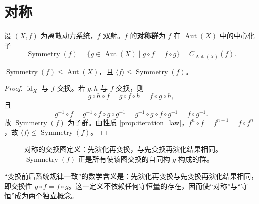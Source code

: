 \section{对称}

\begin{definition}[动力系统的对称群]\label{def:symmetry_group}
设 $(X,f)$ 为离散动力系统，$f$ 双射。$f$ 的\textbf{对称群}为 $f$ 在 $\operatorname{Aut}(X)$ 中的中心化子
\[
\operatorname{Symmetry}(f)=\{g\in\operatorname{Aut}(X)\mid g\circ f=f\circ g\}
=C_{\operatorname{Aut}(X)}(f).
\]
\end{definition}

\begin{property}[对称群是群]\label{prop:symmetry_group_is_group}
$\operatorname{Symmetry}(f)\le\operatorname{Aut}(X)$，且 $\langle f\rangle\le\operatorname{Symmetry}(f)$。
\end{property}

\begin{proof}
$\operatorname{id}_X$ 与 $f$ 交换。若 $g,h$ 与 $f$ 交换，则
\[
g\circ h\circ f=g\circ f\circ h=f\circ g\circ h,
\]
且
\[
g^{-1}\circ f=g^{-1}\circ f\circ g\circ g^{-1}
=g^{-1}\circ g\circ f\circ g^{-1}=f\circ g^{-1}.
\]
故 $\operatorname{Symmetry}(f)$ 为子群。由性质 \ref{prop:iteration_law}，$f^n\circ f=f^{n+1}=f\circ f^n$，故 $\langle f\rangle\le\operatorname{Symmetry}(f)$。
\end{proof}

\begin{figure}[htbp]
\centering
{}
\caption{对称的交换图定义：先演化再变换，与先变换再演化结果相同。$\operatorname{Symmetry}(f)$ 正是所有使该图交换的自同构 $g$ 构成的群。}
\label{fig:symmetry_commute}
\end{figure}

\begin{remark}[为何用中心化子定义对称]\label{rem:why_centraliser}
“变换前后系统规律一致”的数学含义是：先演化再变换与先变换再演化结果相同，即交换性 $g\circ f=f\circ g$。这一定义不依赖任何守恒量的存在，因而使“对称”与“守恒”成为两个独立概念。
\end{remark}

